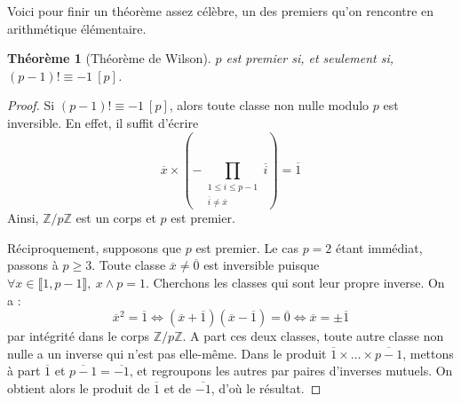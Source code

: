 \documentclass[french]{book}
\newcommand{\Z}{\mathbb{Z}}
\theoremstyle{plain}
\newtheorem{thm}{Théorème}[chapter]
\theoremstyle{definition}
\theoremstyle{remark}
\begin{document}
Voici pour finir un théorème assez célèbre, un des premiers qu'on rencontre en arithmétique élémentaire.
\begin{thm}[Théorème de Wilson]
	$p$ est premier si, et seulement si, $(p-1)!\equiv -1\ [p]$.
\end{thm}
\begin{proof}
	Si $(p-1)!\equiv -1\ [p]$, alors toute classe non nulle modulo $p$ est inversible. En effet, il suffit d'écrire $$\overline{x}\times\left(-\prod_{\substack{1\leqslant i \leqslant p-1 \\ \overline{i}\ne\overline{x}}}\overline{i}\right)=\overline{1}$$ Ainsi, $\Z/p\Z$ est un corps et $p$ est premier. \par Réciproquement, supposons que $p$ est premier. Le cas $p=2$ étant immédiat, passons à $p\geqslant3$. Toute classe $\overline{x}\ne\overline{0}$ est inversible puisque $\forall x\in\llbracket1,p-1\rrbracket,\ x\wedge p=1$. Cherchons les classes qui sont leur propre inverse. On a : $$\overline{x}^2=\overline{1}\iff(\overline{x}+\overline{1})(\overline{x}-\overline{1})=\overline{0}\iff \overline{x}=\pm\overline{1}$$ par intégrité dans le corps $\Z/p\Z$. A part ces deux classes, toute autre classe non nulle a un inverse qui n'est pas elle-même. Dans le produit $\overline{1}\times\ldots\times\overline{p-1}$, mettons à part $\overline{1}$ et $\overline{p-1}=\overline{-1}$, et regroupons les autres par paires d'inverses mutuels. On obtient alors le produit de $\overline{1}$ et de $\overline{-1}$, d'où le résultat.
\end{proof}
\end{document}
